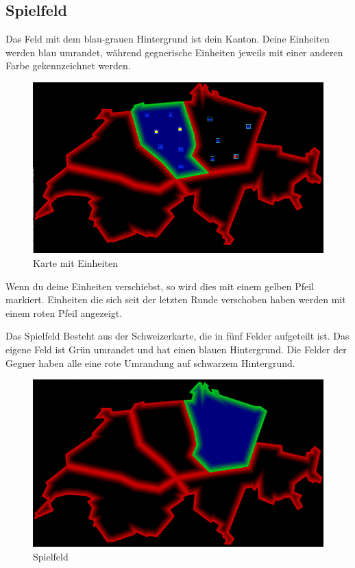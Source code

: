 \documentclass[ngerman, 12pt, pdftex]{scrartcl}[2006/07/30]
\begin{document}
\newpage

\subsection{Spielfeld}
Das Feld mit dem blau-grauen Hintergrund ist dein Kanton. Deine Einheiten werden blau umrandet, während gegnerische Einheiten jeweils mit einer anderen Farbe gekennzeichnet werden.
\begin{figure}[h!]
\centering
\includegraphics[scale=0.4]{spiel/map_with_units.png}
\caption{Karte mit Einheiten}
\end{figure}
Wenn du deine Einheiten verschiebst, so wird dies mit einem gelben Pfeil markiert. Einheiten die sich seit der letzten Runde verschoben haben werden mit einem roten Pfeil angezeigt.

Das Spielfeld Besteht aus der Schweizerkarte, die in fünf Felder aufgeteilt ist. Das eigene Feld ist Grün umrandet und hat einen blauen Hintergrund. Die Felder der Gegner haben alle eine rote Umrandung auf schwarzem Hintergrund.

\begin{figure}[h]
\centering
\includegraphics[scale=0.3]{spiel/spielfeld.png}
\caption{Spielfeld}
\end{figure}
\end{document}
